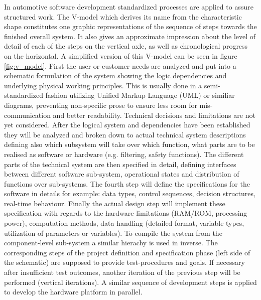 \documentclass[ExampleMasters.tex]{subfiles}
\begin{document}
In automotive software development standardized processes are applied to assure structured work. The V-model which derives its name from the characteristic shape constitutes one graphic representations of the sequence of steps towards the finished overall system. It also gives an approximate impression about the level of detail of each of the steps on the vertical axle, as well as chronological progress on the horizontal. A simplified version of this V-model can be seen in figure \ref{fig:v_model}. First the user or customer needs are analyzed and put into a schematic formulation of the system showing the logic dependencies and underlying physical working principles. This is usually done in a semi-standardized fashion utilizing Unified Markup Language (UML) or similiar diagrams, preventing non-specific prose to ensure less room for mis-communication and better readability. Technical decisions and limitations are not yet considered. After the logical system and dependencies have been established they will be analyzed and broken down to actual technical system descriptions defining also which subsystem will take over which function, what parts are to be realised as software or hardware (e.g. filtering, safety functions). The different parts of the technical system are then specified in detail, defining interfaces between different software sub-system, operational states and distribution of functions over sub-systems. The fourth step will define the specifications for the software in details for example: data types, control sequences, decision structures, real-time behaviour. Finally the actual design step will implement these specification with regards to the hardware limitations (RAM/ROM, processing power), computation methods, data handling (detailed format, variable types, utilization of parameters or variables). To compile the system from the component-level sub-system a similar hierachy is used in inverse. The corresponding steps of the project definition and specification phase (left side of the schematic) are supposed to provide test-procedures and goals. If necessary after insufficient test outcomes, another iteration of the previous step will be performed (vertical iterations). A similar sequence of development steps is applied to develop the hardware platform in parallel.\cite{automotive_software_engineering}
\end{document}
